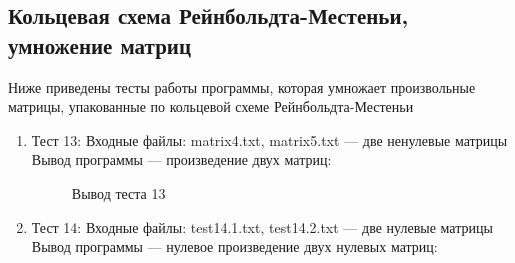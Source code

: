 \documentclass[12pt, a4paper]{article}
\begin{document}
\subsection{Кольцевая схема Рейнбольдта-Местеньи, умножение матриц}
Ниже приведены тесты работы программы, которая умножает произвольные матрицы, 
упакованные по кольцевой схеме Рейнбольдта-Местеньи
\begin{enumerate}
	\item Тест 13:
	Входные файлы: matrix4.txt, 
	matrix5.txt --- две ненулевые матрицы\\
	Вывод программы --- произведение двух матриц:
	\begin{figure}[h]
  		\caption{Вывод теста 13}
	\end{figure}
	\newpage
	\item Тест 14: Входные файлы: test14.1.txt, 
	test14.2.txt --- две нулевые матрицы\\
	Вывод программы --- нулевое произведение двух нулевых матриц:
	\begin{figure}[h]

\end{figure}
\end{enumerate}
\end{document}
